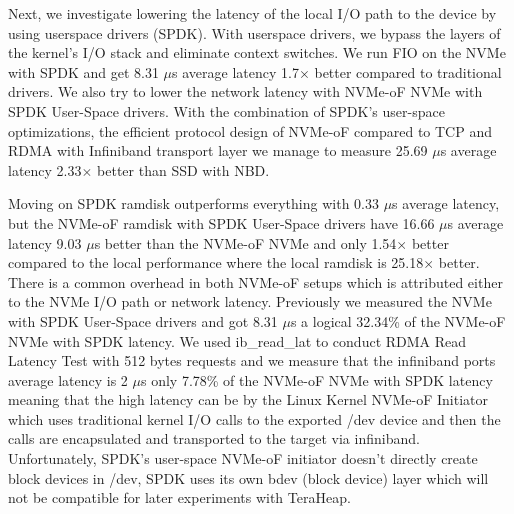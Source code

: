Next, we investigate lowering the latency of the local I/O path to the device by using userspace drivers (SPDK). With userspace drivers, we bypass the layers of the kernel's I/O stack and eliminate context switches. We run FIO on the NVMe with SPDK and get 8.31 $\mu$s average latency 1.7$\times$ better compared to traditional drivers. We also try to lower
the network latency with NVMe-oF NVMe with SPDK User-Space drivers. With the combination of SPDK’s user-space optimizations, the efficient protocol design of NVMe-oF compared to TCP and RDMA with Infiniband transport layer we manage to measure 25.69 $\mu$s average latency 2.33$\times$ better than SSD with NBD. 

Moving on SPDK ramdisk outperforms everything with 0.33 $\mu$s average latency, but the NVMe-oF ramdisk with SPDK User-Space drivers have 16.66 $\mu$s average latency 9.03 $\mu$s better than the NVMe-oF NVMe and only 1.54$\times$ better compared to the local performance where the local ramdisk is 25.18$\times$ better. There is a common overhead in both NVMe-oF setups which is attributed either to the NVMe I/O path or network latency. Previously we measured the NVMe with SPDK User-Space drivers and got 8.31 $\mu$s a logical 32.34\% of the NVMe-oF NVMe with SPDK latency. We used ib\_read\_lat to conduct RDMA Read Latency Test with 512 bytes requests and we measure that the infiniband ports average latency is 2 $\mu$s only 7.78\% of the NVMe-oF NVMe with SPDK latency meaning that the high latency can be by the Linux Kernel NVMe-oF Initiator which uses traditional kernel I/O calls to the exported /dev device and then the calls are encapsulated and transported to the target via infiniband. Unfortunately, SPDK's user-space NVMe-oF initiator doesn't directly create block devices in /dev, SPDK uses its own bdev (block device) layer which will not be
compatible for later experiments with TeraHeap. 

